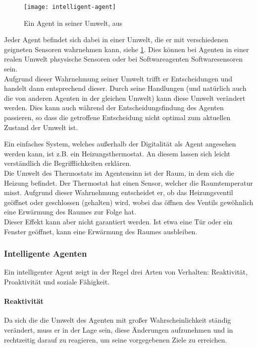 \begin{figure}[hptb]
 \centering
 \texttt{[image: intelligent-agent]}
 \caption[Ein Agent in seiner Umwelt]
 		{Ein Agent in seiner Umwelt, aus \cite{multiagent}}
 \label{figure:intelligent-agent}
\end{figure}
\noindent
Jeder Agent befindet sich dabei in einer Umwelt, die er mit verschiedenen geigneten Sensoren wahrnehmen kann, siehe \cref{figure:intelligent-agent}.
Dies können bei Agenten in einer realen Umwelt phsysische Sensoren oder bei Softwareagenten Softwaresensoren sein.
\\
Aufgrund dieser Wahrnehmung seiner Umwelt trifft er Entscheidungen und handelt dann entsprechend dieser.
Durch seine Handlungen (und natürlich auch die von anderen Agenten in der gleichen Umwelt) kann diese Umwelt verändert werden.
Dies kann auch während der Entscheidungsfindung des Agenten passieren, so dass die getroffene Entscheidung nicht optimal zum aktuellen Zustand der Umwelt ist.

Ein einfaches System, welches außerhalb der Digitalität als Agent angesehen werden kann, ist z.B. ein Heizungsthermostat.
An diesem lassen sich leicht verständlich die Begrifflichkeiten erklären.
\\
Die Umwelt des Thermostats im Agentensinn ist der Raum, in dem sich die Heizung befindet.
Der Thermostat hat einen Sensor, welcher die Raumtemperatur misst.
Aufgrund dieser Wahrnehmung entscheidet er, ob das Heizungsventil geöffnet oder geschlossen (gehalten) wird, wobei das öffnen des Ventils gewöhnlich eine Erwärmung des Raumes zur Folge hat.
\\
Dieser Effekt kann aber nicht garantiert werden.
Ist etwa eine Tür oder ein Fenster geöffnet, kann eine Erwärmung des Raumes ausbleiben.


\subsubsection{Intelligente Agenten}

Ein intelligenter Agent zeigt in der Regel drei Arten von Verhalten: Reaktivität, Proaktivität und soziale Fähigkeit.

\paragraph*{Reaktivität} 
Da sich die die Umwelt des Agenten  mit großer Wahrscheinlichkeit ständig verändert, muss er in der Lage sein, diese Änderungen aufzunehmen und in rechtzeitig darauf zu reagieren, um seine vorgegebenen Ziele zu erreichen.

